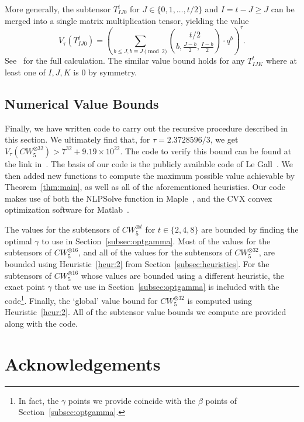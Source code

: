 \documentclass{theoretics}
\begin{document}
More generally, the subtensor $T^t_{IJ0}$ for $J \in \{0,1,\ldots,t/2\}$ and $I = t-J \geq J$ can be merged into a single matrix multiplication tensor, yielding the value $$V_\tau(T^t_{IJ0}) = \left( \sum_{b \leq J, b \equiv J\pmod{2}} \binom{t/2}{b,\frac{J-b}{2},\frac{I-b}{2}} \cdot q^b  \right)^\tau.$$
 See~\cite[{Claim~1}]{v12} for the full calculation. The similar value bound holds for any $T^t_{IJK}$ where at least one of $I,J,K$ is $0$ by symmetry.

\subsection{Numerical Value Bounds}

Finally, we have written code to carry out the recursive procedure described in this section. We ultimately find that, for $\tau = 2.3728596 / 3$, we get $V_\tau(CW_5^{\otimes 32}) > 7^{32} + 9.19 \times 10^{22}$. The code to verify this bound can be found at the link in~\cite{vercode}.
The basis of our code is the publicly available code of Le Gall~\cite{legall}. We then added new functions to compute the maximum possible value achievable by Theorem~\ref{thm:main}, as well as all of the aforementioned heuristics. Our code makes use of both the NLPSolve function in Maple~\cite{maple}, and the CVX convex optimization software for Matlab~\cite{cvx,gb08,MATLAB2019}.

The values for the subtensors of $CW_5^{\otimes t}$ for $t \in \{2,4,8\}$ are bounded by finding the optimal $\gamma$ to use in Section~\ref{subsec:optgamma}. Most of the values for the subtensors of $CW_5^{\otimes 16}$, and all of the values for the subtensors of $CW_5^{\otimes 32}$, are bounded using Heuristic~\ref{heur:2} from Section~\ref{subsec:heuristics}. For the subtensors of $CW_5^{\otimes 16}$ whose values are bounded using a different heuristic, the exact point $\gamma$ that we use in Section~\ref{subsec:optgamma} is included with the code\footnote{In fact, the $\gamma$ points we provide coincide with the $\beta$ points of Section~\ref{subsec:optgamma}.}. Finally, the `global' value bound for $CW_5^{\otimes 32}$ is computed using Heuristic~\ref{heur:2}. All of the subtensor value bounds we compute are provided along with the code.
 
\section*{Acknowledgements}
\end{document}
